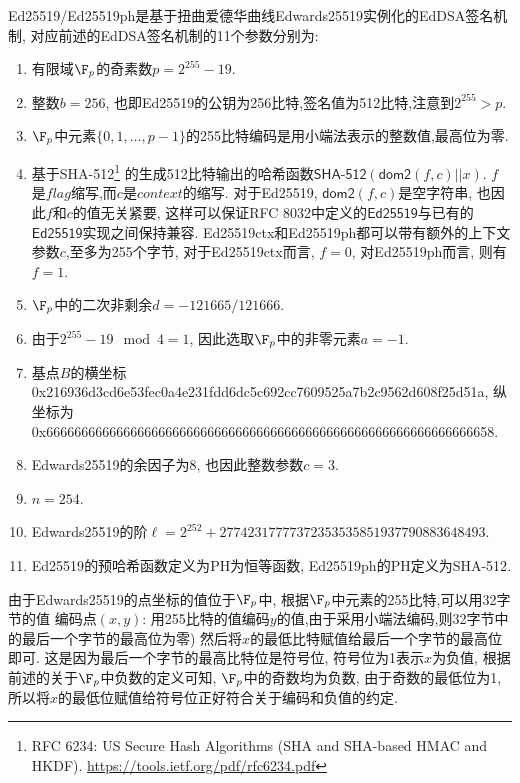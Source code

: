 \textsf{Ed25519}/\textsf{Ed25519ph}是基于扭曲爱德华曲线Edwards25519实例化的EdDSA签名机制, 
对应前述的EdDSA签名机制的11个参数分别为: 
\begin{enumerate}
\item 有限域$\F_p$的奇素数$p = 2^{255} - 19$.
\item 整数$b  = 256$, 也即\textsf{Ed25519}的公钥为256比特,签名值为512比特,注意到$2^{255} > p$.
\item $\F_p$中元素$\{0, 1, \ldots, p-1\}$的255比特编码是用小端法表示的整数值,最高位为零.
\item 
基于\textsf{SHA-512}\footnote{
RFC 6234: US Secure Hash Algorithms (SHA and SHA-based HMAC and HKDF).
\url{https://tools.ietf.org/pdf/rfc6234.pdf}}
的生成512比特输出的哈希函数$\textsf{SHA-512}(\textsf{dom2}(f, c) || x)$.
$f$是$flag$缩写,而$c$是$context$的缩写.
对于\textsf{Ed25519}, $\textsf{dom2}(f, c)$是空字符串, 也因此$f$和$c$的值无关紧要,
这样可以保证RFC 8032中定义的$\textsf{Ed25519}$与已有的$\textsf{Ed25519}$实现之间保持兼容. 
\textsf{Ed25519ctx}和\textsf{Ed25519ph}都可以带有额外的上下文参数$c$,至多为255个字节,
对于\textsf{Ed25519ctx}而言, $f = 0$, 对\textsf{Ed25519ph}而言, 则有$f = 1$. 
\item $\F_p$中的二次非剩余$d = -121665/121666$.
\item 由于$2^{255}-19 \mod 4 = 1$, 因此选取$\F_p$中的非零元素$a = -1$.
\item 基点$B$的横坐标\small{\textsf{0x216936d3cd6e53fec0a4e231fdd6dc5c692cc7609525a7b2c9562d608f25d51a}},
\normalsize
纵坐标为\small{\textsf{0x6666666666666666666666666666666666666666666666666666666666666658}}.
\normalsize
\item Edwards25519的余因子为8, 也因此整数参数$c = 3$.
\item $n = 254$.
\item Edwards25519的阶$\ell = 2^{252}+27742317777372353535851937790883648493$.
\item \textsf{Ed25519}的预哈希函数定义为\textsf{PH}为恒等函数, \textsf{Ed25519ph}的\textsf{PH}定义为\textsf{SHA-512}.
\end{enumerate}

由于Edwards25519的点坐标的值位于$\F_p$中, 根据$\F_p$中元素的255比特,可以用32字节的值
编码点$(x,y)$: 用255比特的值编码$y$的值,由于采用小端法编码,则32字节中的最后一个字节的最高位为零)
然后将$x$的最低比特赋值给最后一个字节的最高位即可. 这是因为最后一个字节的最高比特位是符号位,
符号位为1表示$x$为负值, 根据前述的关于$\F_p$中负数的定义可知, $\F_p$中的奇数均为负数, 
由于奇数的最低位为1, 所以将$x$的最低位赋值给符号位正好符合关于编码和负值的约定.

